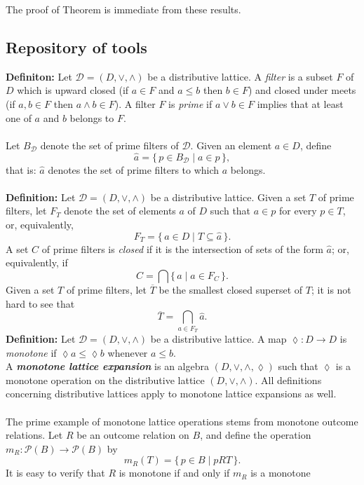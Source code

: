 \documentclass[12pt]{article}
\begin{document}
The proof of Theorem is immediate from these results.
\subsection{Repository of tools}

\textbf{Definiton:} Let $\mathcal{D} = (D, \vee, \wedge)$ be a distributive lattice. 
A \emph{filter} is a subset $F$ of $D$ which is upward closed 
(if $a \in F$ and $a \leq b$ then $b \in F$) and closed under meets 
(if $a, b \in F$ then $a \wedge b \in F$). 
A filter $F$ is \emph{prime} if $a \vee b \in F$ implies that at least one 
of $a$ and $b$ belongs to $F$. \\ \\
Let $B_{\mathcal{D}}$ denote the set of prime filters of $\mathcal{D}$.  
Given an element $a \in D$, define
\[
\hat{a} = \{\, p \in B_{\mathcal{D}} \mid a \in p \,\},
\]
that is: $\hat{a}$ denotes the set of prime filters to which $a$ belongs. \\ \\
\textbf{Definition:}
Let $\mathcal{D} = (D, \vee, \wedge)$ be a distributive lattice. 
Given a set $T$ of prime filters, let $F_T$ denote the set of elements 
$a$ of $D$ such that $a \in p$ for every $p \in T$, or, equivalently,
\[
   F_T = \{\, a \in D \mid T \subseteq \hat{a} \,\}.
\]
A set $C$ of prime filters is \emph{closed} if it is the intersection of 
sets of the form $\hat{a}$; or, equivalently, if 
\[
   C = \bigcap \{\, \hat{a} \mid a \in F_C \,\}.
\]
Given a set $T$ of prime filters, let $\overline{T}$ be the smallest 
closed superset of $T$; it is not hard to see that 
\[
   \overline{T} = \bigcap_{a \in F_T} \hat{a}. 
   \]
\textbf{Definition:} Let $\mathcal{D} = (D, \vee, \wedge)$ be a distributive lattice. 
A map $\lozenge : D \to D$ is \emph{monotone} if $\lozenge a \leq \lozenge b$ whenever $a \leq b$. \\
A \textbf{\emph{monotone lattice expansion}} is an algebra $(D, \vee, \wedge, \lozenge)$ such that $\lozenge$ is a monotone operation on the distributive lattice $(D, \vee, \wedge)$.  
All definitions concerning distributive lattices apply to monotone lattice expansions as well. \\ \\
The prime example of monotone lattice operations stems from monotone 
outcome relations. Let $R$ be an outcome relation on $B$, and define the 
operation $m_R : \mathcal{P}(B) \to \mathcal{P}(B)$ by
\[
m_R(T) = \{\, p \in B \mid pRT \,\}.
\]
It is easy to verify that $R$ is monotone if and only if $m_R$ is a monotone 
\end{document}
